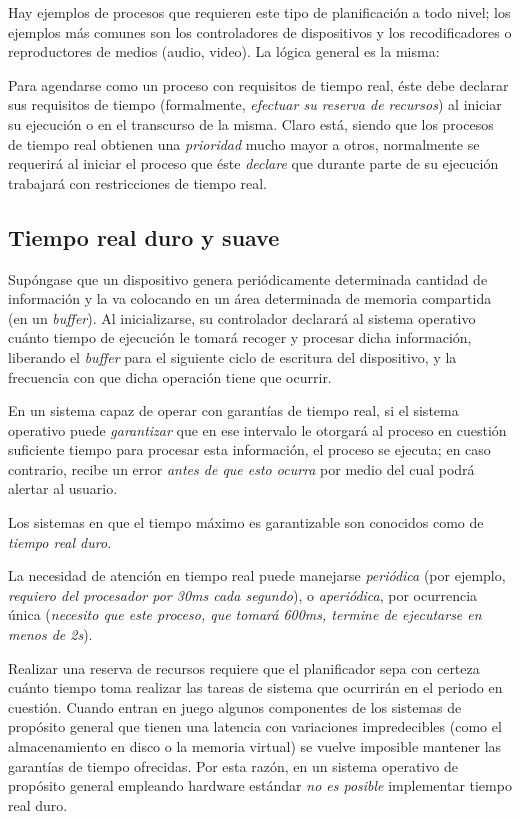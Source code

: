 \documentclass[11pt,fleqn]{book} %
\begin{document}
Hay ejemplos de procesos que requieren este tipo de
planificación a todo nivel; los ejemplos más comunes son los
controladores de dispositivos y los recodificadores o reproductores de
medios (audio, video). La lógica general es la misma:

Para agendarse como un proceso con requisitos de tiempo real, éste
debe declarar sus requisitos de tiempo (formalmente, \emph{efectuar su reserva de recursos}) al iniciar su ejecución o en el transcurso de la
misma. Claro está, siendo que los procesos de tiempo real obtienen una
\emph{prioridad} mucho mayor a otros, normalmente se requerirá al iniciar
el proceso que éste \emph{declare} que durante parte de su ejecución
trabajará con restricciones de tiempo real.
\subsection{Tiempo real duro y suave}
\label{sec-4-5-1}


Supóngase que un dispositivo genera periódicamente determinada
cantidad de información y la va colocando en un área determinada de
memoria compartida (en un \emph{buffer}). Al inicializarse, su controlador
declarará al sistema operativo cuánto tiempo de ejecución le tomará
recoger y procesar dicha información, liberando el \emph{buffer} para el
siguiente ciclo de escritura del dispositivo, y la frecuencia con que
dicha operación tiene que ocurrir.

En un sistema capaz de operar con garantías de tiempo real, si el
sistema operativo puede \emph{garantizar} que en ese intervalo le otorgará
al proceso en cuestión suficiente tiempo para procesar esta
información, el proceso se ejecuta; en caso contrario, recibe un error
\emph{antes de que esto ocurra} por medio del cual podrá alertar al usuario.

Los sistemas en que el tiempo máximo es garantizable son conocidos
como de \emph{tiempo real duro}.

La necesidad de atención en tiempo real puede manejarse \emph{periódica}
(por ejemplo, \emph{requiero del procesador por 30ms cada segundo}), o
\emph{aperiódica}, por ocurrencia única (\emph{necesito que este proceso, que tomará 600ms, termine de ejecutarse en menos de 2s}).

Realizar una reserva de recursos requiere que el planificador sepa con
certeza cuánto tiempo toma realizar las tareas de sistema que
ocurrirán en el periodo en cuestión. Cuando entran en juego algunos
componentes de los sistemas de propósito general que tienen una
latencia con variaciones impredecibles (como el almacenamiento en
disco o la memoria virtual) se vuelve imposible mantener las garantías
de tiempo ofrecidas. Por esta razón, en un sistema operativo de
propósito general empleando hardware estándar \emph{no es posible}
implementar tiempo real duro.
\end{document}
